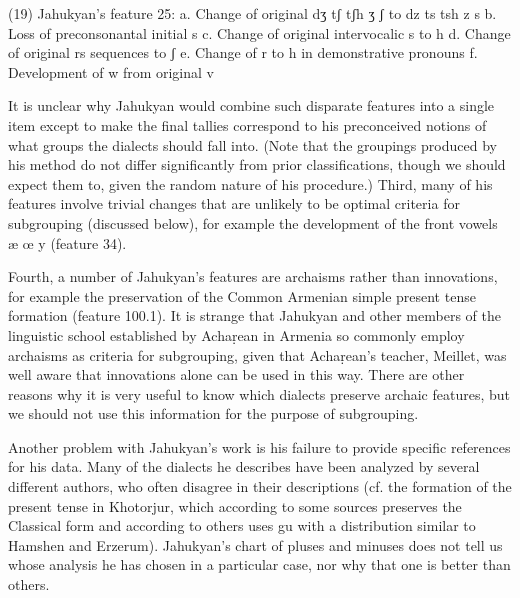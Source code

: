 \begin{exe} \ex {}
(19) Jahukyan’s feature 25:
a.	Change of original {dʒ tʃ tʃh ʒ ʃ} to {dz ts tsh z s}
b.	Loss of preconsonantal initial s
c.	Change of original intervocalic s to h
d.	Change of original rs sequences to ʃ
e.	Change of r to h in demonstrative pronouns
f.	Development of w from original v
\end{exe}

It is unclear why Jahukyan would combine such disparate features into a single item except to make the final tallies correspond to his preconceived notions of what groups the dialects should fall into. (Note that the groupings produced by his method do not differ significantly from prior classifications, though we should expect them to, given the random nature of his procedure.) Third, many of his features involve trivial changes that are unlikely to be optimal criteria for subgrouping (discussed below), for example the development of the front vowels æ œ y (feature 34). 

Fourth, a number of Jahukyan’s features are archaisms rather than innovations, for example the preservation of the Common Armenian simple present tense formation (feature 100.1). It is strange that Jahukyan and other members of the linguistic school established by Achaṛean in Armenia so commonly employ archaisms as criteria for subgrouping, given that Achaṛean’s teacher, Meillet, was well aware that innovations alone can be used in this way. There are other reasons why it is very useful to know which dialects preserve archaic features, but we should not use this information for the purpose of subgrouping. 

Another problem with Jahukyan’s work is his failure to provide specific references for his data. Many of the dialects he describes have been analyzed by several different authors, who often disagree in their descriptions (cf. the formation of the present tense in Khotorjur, which according to some sources preserves the Classical form and according to others uses gu with a distribution similar to Hamshen and Erzerum). Jahukyan’s chart of pluses and minuses does not tell us whose analysis he has chosen in a particular case, nor why that one is better than others.

